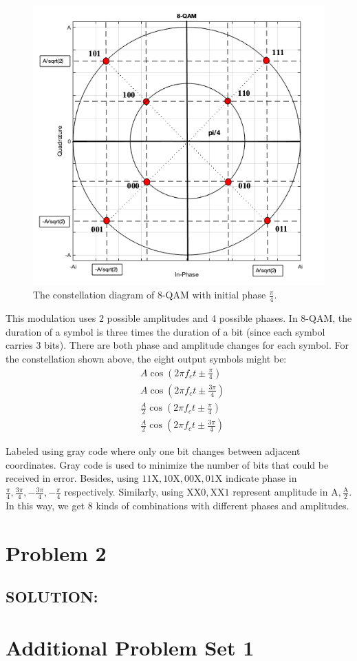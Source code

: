 \documentclass{article}
\begin{document}
\begin{figure}[!h]
\centering
\includegraphics[scale=0.5]{./figure/QAM_8_1}
\caption{The constellation diagram of 8-QAM with initial phase $\frac{\pi}{4}$.}
\label{fig:8-QAM}
\end{figure}

\par This modulation uses 2 possible amplitudes and 4 possible phases. In 8-QAM, the duration of a symbol is three times the duration of a bit (since each symbol carries 3 bits). There are both phase and amplitude changes for each symbol. For the constellation shown above, the eight output symbols might be:
\begin{equation}
\begin{split}
& A\cos(2\pi f_c t \pm \frac{\pi}{4}) \\
& A\cos(2\pi f_c t \pm \frac{3\pi}{4}) \\
& \frac{A}{2}\cos(2\pi f_c t \pm \frac{\pi}{4}) \\
& \frac{A}{2}\cos(2\pi f_c t \pm \frac{3\pi}{4}) 
\end{split}
\end{equation}

\par  Labeled using gray code where only one bit changes between adjacent coordinates. Gray code is used to minimize the number of bits that could be received in error. Besides, using $11\mathrm{X}, 10\mathrm{X}, 00\mathrm{X}, 01\mathrm{X}$ indicate phase in $\frac{\pi}{4},\frac{3\pi}{4},-\frac{3\pi}{4}, -\frac{\pi}{4}$ respectively. Similarly, using $\mathrm{XX}0, \mathrm{XX}1$ represent amplitude in $\mathrm{A},\mathrm{\frac{A}{2}}$. In this way, we get $8$ kinds of combinations with different phases and amplitudes.

\newpage
\section{Problem 2}
\subsection*{SOLUTION:}




\section{Additional Problem Set 1}
\end{document}
